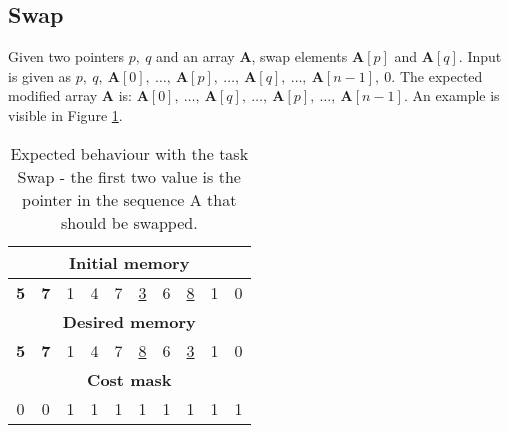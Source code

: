 \subsection{Swap}
Given two pointers $p,\ q$ and an array \textbf{A}, swap elements $\textbf{A}[p]$ and $\textbf{A}[q]$. Input is given as $p,\ q,\ \textbf{A}[0],\ \dots,\ \textbf{A}[p],\ \dots,\ \textbf{A}[q],\ \dots,\ \textbf{A}[n-1],\ 0$. The expected modified array \textbf{A} is: $\textbf{A}[0],\ \dots,\ \textbf{A}[q],\ \dots,\ \textbf{A}[p],\ \dots,\ \textbf{A}[n-1]$. An example is visible in Figure \ref{fig:swap-example}.
\begin{table}[h!]
	\centering
	\begin{tabular}{|c|c|c|c|c|c|c|c|c|c|}
		\hline
		\multicolumn{10}{|c|}{\textbf{Initial memory}} \\ \hline
		\textbf{5} & \textbf{7} & 1 & 4 & 7 & \underline{3} & 6 & \underline{8} & 1 & 0 \\ \hline\hline\hline
		\multicolumn{10}{|c|}{\textbf{Desired memory}} \\ \hline
		\textbf{5} & \textbf{7} & 1 & 4 & 7 & \underline{8} & 6 & \underline{3} & 1 & 0 \\ \hline\hline\hline
		\multicolumn{10}{|c|}{\textbf{Cost mask}} \\ \hline
		0 & 0 & 1 & 1 & 1 & 1 & 1 & 1 & 1 & 1 \\ \hline
	\end{tabular}
	\caption{Expected behaviour with the task Swap - the first two value is the pointer in the sequence A that should be swapped.}
	\label{fig:swap-example}
\end{table}
\FloatBarrier

